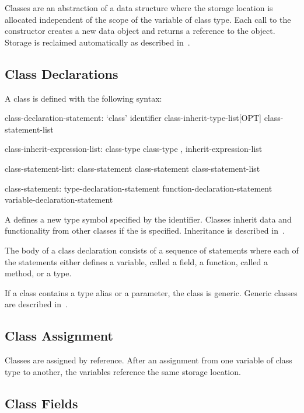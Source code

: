 \label{Classes}

Classes are an abstraction of a data structure where the storage
location is allocated independent of the scope of the variable of
class type.  Each call to the constructor creates a new data object
and returns a reference to the object.  Storage is reclaimed
automatically as described in~.

\subsection{Class Declarations}
\label{Class_Declarations}

A class is defined with the following syntax:
\begin{syntax}
class-declaration-statement:
  `class' identifier class-inherit-type-list[OPT] {
    class-statement-list }

class-inherit-expression-list:
  class-type
  class-type , inherit-expression-list

class-statement-list:
  class-statement
  class-statement class-statement-list

class-statement:
  type-declaration-statement
  function-declaration-statement
  variable-declaration-statement
\end{syntax}
A  defines a new type symbol
specified by the identifier.  Classes inherit data and functionality
from other classes if the  is specified.
Inheritance is described in~.

The body of a class declaration consists of a sequence of statements
where each of the statements either defines a variable, called a
field, a function, called a method, or a type.

If a class contains a type alias or a parameter, the class is generic.
Generic classes are described in~.

\subsection{Class Assignment}
\label{Class_Assignment}

Classes are assigned by reference.  After an assignment from one
variable of class type to another, the variables reference the same
storage location.

\subsection{Class Fields}
\label{Class_Fields}

